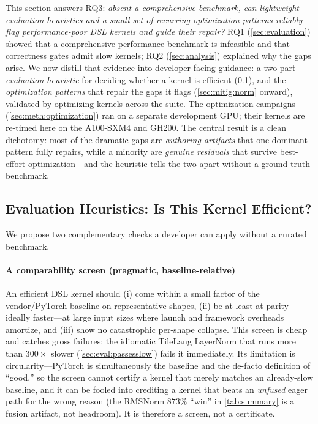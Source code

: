 This section answers RQ3: \emph{absent a comprehensive benchmark, can lightweight evaluation heuristics and a small set of recurring optimization patterns reliably flag performance-poor DSL kernels and guide their repair?}
RQ1 (\cref{sec:evaluation}) showed that a comprehensive performance benchmark is infeasible and that correctness gates admit slow kernels; RQ2 (\cref{sec:analysis}) explained why the gaps arise.
We now distill that evidence into developer-facing guidance: a two-part \emph{evaluation heuristic} for deciding whether a kernel is efficient (\cref{sec:mitig:heuristics}), and the \emph{optimization patterns} that repair the gaps it flags (\cref{sec:mitig:norm} onward), validated by optimizing kernels across the suite.
The optimization campaigns (\cref{sec:meth:optimization}) ran on a separate development GPU; their kernels are re-timed here on the A100-SXM4 and GH200.
The central result is a clean dichotomy: most of the dramatic gaps are \emph{authoring artifacts} that one dominant pattern fully repairs, while a minority are \emph{genuine residuals} that survive best-effort optimization---and the heuristic tells the two apart without a ground-truth benchmark.

\subsection{Evaluation Heuristics: Is This Kernel Efficient?}
\label{sec:mitig:heuristics}

We propose two complementary checks a developer can apply without a curated benchmark.

\paragraph{A comparability screen (pragmatic, baseline-relative)}
An efficient DSL kernel should (i) come within a small factor of the vendor/PyTorch baseline on representative shapes, (ii) be at least at parity---ideally faster---at large input sizes where launch and framework overheads amortize, and (iii) show no catastrophic per-shape collapse.
This screen is cheap and catches gross failures: the idiomatic TileLang LayerNorm that runs more than $300\times$ slower (\cref{sec:eval:passesslow}) fails it immediately.
Its limitation is circularity---PyTorch is simultaneously the baseline and the de-facto definition of ``good,'' so the screen cannot certify a kernel that merely matches an already-slow baseline, and it can be fooled into crediting a kernel that beats an \emph{unfused} eager path for the wrong reason (the RMSNorm $873\%$ ``win'' in \cref{tab:summary} is a fusion artifact, not headroom).
It is therefore a screen, not a certificate.

